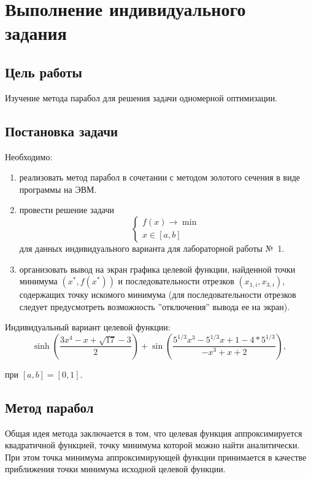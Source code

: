 \chapter{Выполнение индивидуального задания}

\section{Цель работы}

Изучение метода парабол для решения задачи одномерной оптимизации.

\section{Постановка задачи}

Необходимо:
\begin{enumerate}
\item реализовать метод парабол в сочетании с методом золотого сечения в виде программы на ЭВМ.
\item провести решение задачи
\begin{equation*}
\begin{cases}
f(x) \rightarrow \min \\
x \in [a, b]
\end{cases}
\end{equation*}
для данных индивидуального варианта для лабораторной работы №~1.
\item организовать вывод на экран графика целевой функции, найденной точки минимума $(x^* , f (x^*))$ и последовательности отрезков $(x_{1,i}, x_{3,i})$, содержащих точку искомого минимума (для последовательности отрезков следует предусмотреть возможность ”отключения” вывода ее на экран).
\end{enumerate}

Индивидуальный вариант целевой функции:
\begin{equation*}
\sinh\left(\frac{3x^4 - x + \sqrt{17} - 3}{2}\right)+\sin\left(\frac{5^{1/3}x^3 - 5^{1/3}x + 1 - 4*5^{1/3}}{-x^3 + x + 2}\right),
\end{equation*}

при $[a, b] = [0, 1]$.

\newpage

\section*{Метод парабол}

Общая идея метода заключается в том, что целевая функция аппроксимируется квадратичной функцией, точку минимума которой можно найти аналитически. При этом точка минимума аппроксимирующей функции принимается в качестве приближения точки минимума исходной целевой функции. 

